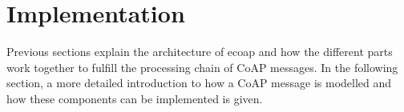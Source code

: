 









\section{Implementation}

Previous sections explain the architecture of ecoap and how the different parts work together to fulfill the processing chain of CoAP messages. In the following section, a more detailed introduction to how a CoAP message is modelled and how these components can be implemented is given.

